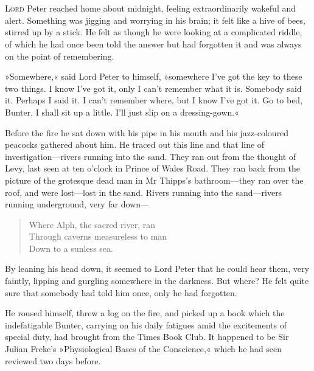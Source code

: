\chapter[Chapter \thechapter]{}
\lettrine[lines=4]{L}{ord} Peter reached home about midnight, feeling extraordinarily wakeful and alert. Something was jigging and worrying in his brain; it felt like a hive of bees, stirred up by a stick. He felt as though he were looking at a complicated riddle, of which he had once been told the answer but had forgotten it and was always on the point of remembering.

»Somewhere,« said Lord Peter to himself, »somewhere I've got the key to these two things. I know I've got it, only I can't remember what it is. Somebody said it. Perhaps I said it. I can't remember where, but I know I've got it. Go to bed, Bunter, I shall sit up a little. I'll just slip on a dressing-gown.«

Before the fire he sat down with his pipe in his mouth and his jazz-coloured peacocks gathered about him. He traced out this line and that line of investigation\allowbreak---\allowbreak rivers running into the sand. They ran out from the thought of Levy, last seen at ten o'clock in Prince of Wales Road. They ran back from the picture of the grotesque dead man in Mr Thipps's bathroom\allowbreak---\allowbreak they ran over the roof, and were lost\allowbreak---\allowbreak lost in the sand. Rivers running into the sand\allowbreak---\allowbreak rivers running underground, very far down---

\begin{verse}
Where Alph, the sacred river, ran\\
Through caverns measureless to man\\
Down to a sunless sea.\\
\end{verse}


By leaning his head down, it seemed to Lord Peter that he could hear them, very faintly, lipping and gurgling somewhere in the darkness. But where? He felt quite sure that somebody had told him once, only he had forgotten.

He roused himself, threw a log on the fire, and picked up a book which the indefatigable Bunter, carrying on his daily fatigues amid the excitements of special duty, had brought from the Times Book Club. It happened to be Sir Julian Freke's »Physiological Bases of the Conscience,« which he had seen reviewed two days before.

